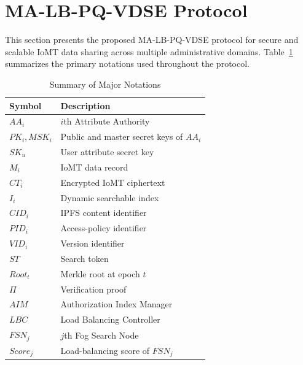 \documentclass{ieeetj}
\theoremstyle{ieee-style}
\begin{document}
\section{MA-LB-PQ-VDSE Protocol}

This section presents the proposed MA-LB-PQ-VDSE protocol for secure and scalable IoMT data sharing across multiple administrative domains. Table~\ref{tab:notation} summarizes the primary notations used throughout the protocol.

\begin{table}[t]
\caption{Summary of Major Notations}
\label{tab:notation}
\centering
\footnotesize
\renewcommand{\arraystretch}{1.05}
\setlength{\tabcolsep}{3pt}

\begin{tabular}{p{}p{}}
\toprule
\textbf{Symbol} & \textbf{Description} \\
\midrule

$AA_i$
& $i$th Attribute Authority \\

$PK_i,MSK_i$
& Public and master secret keys of $AA_i$ \\

$SK_u$
& User attribute secret key \\

$M_i$
& IoMT data record \\

$CT_i$
& Encrypted IoMT ciphertext \\

$I_i$
& Dynamic searchable index \\

$CID_i$
& IPFS content identifier \\

$PID_i$
& Access-policy identifier \\

$VID_i$
& Version identifier \\

$ST$
& Search token \\

$Root_t$
& Merkle root at epoch $t$ \\

$\Pi$
& Verification proof \\

$AIM$
& Authorization Index Manager \\

$LBC$
& Load Balancing Controller \\

$FSN_j$
& $j$th Fog Search Node \\

$Score_j$
& Load-balancing score of $FSN_j$ \\

\bottomrule
\end{tabular}
\end{table}
\end{document}
